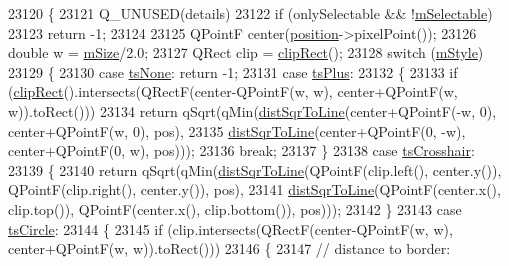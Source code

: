 \begin{DoxyCode}
23120 \{
23121   Q\_UNUSED(details)
23122   if (onlySelectable && !\hyperlink{class_q_c_p_abstract_item_ad81eb35c8726a0f458db9df9732e0e41}{mSelectable})
23123     return -1;
23124 
23125   QPointF center(\hyperlink{class_q_c_p_item_tracer_a69917e2fdb2b3a929c196958feee7cbe}{position}->pixelPoint());
23126   \textcolor{keywordtype}{double} w = \hyperlink{class_q_c_p_item_tracer_a575153a24bb357d1e006f6bc3bd099b9}{mSize}/2.0;
23127   QRect clip = \hyperlink{class_q_c_p_abstract_item_a538e25ff8856534582f5b2b400a46405}{clipRect}();
23128   switch (\hyperlink{class_q_c_p_item_tracer_afb1f236bebf417544e0138fef22a292e}{mStyle})
23129   \{
23130     \textcolor{keywordflow}{case} \hyperlink{class_q_c_p_item_tracer_a2f05ddb13978036f902ca3ab47076500aac27462c79146225bfa8fba24d2ee8a4}{tsNone}: \textcolor{keywordflow}{return} -1;
23131     \textcolor{keywordflow}{case} \hyperlink{class_q_c_p_item_tracer_a2f05ddb13978036f902ca3ab47076500a3323fb04017146e4885e080a459472fa}{tsPlus}:
23132     \{
23133       \textcolor{keywordflow}{if} (\hyperlink{class_q_c_p_abstract_item_a538e25ff8856534582f5b2b400a46405}{clipRect}().intersects(QRectF(center-QPointF(w, w), center+QPointF(w, w)).toRect()))
23134         \textcolor{keywordflow}{return} qSqrt(qMin(\hyperlink{class_q_c_p_abstract_item_acdca343717d625b8abb3c3e38c0ed39d}{distSqrToLine}(center+QPointF(-w, 0), center+QPointF(w, 0), pos),
23135                           \hyperlink{class_q_c_p_abstract_item_acdca343717d625b8abb3c3e38c0ed39d}{distSqrToLine}(center+QPointF(0, -w), center+QPointF(0, w), pos)));
23136       \textcolor{keywordflow}{break};
23137     \}
23138     \textcolor{keywordflow}{case} \hyperlink{class_q_c_p_item_tracer_a2f05ddb13978036f902ca3ab47076500af562ec81ac3ba99e26ef8540cf1ec16f}{tsCrosshair}:
23139     \{
23140       \textcolor{keywordflow}{return} qSqrt(qMin(\hyperlink{class_q_c_p_abstract_item_acdca343717d625b8abb3c3e38c0ed39d}{distSqrToLine}(QPointF(clip.left(), center.y()), QPointF(clip.right(), 
      center.y()), pos),
23141                         \hyperlink{class_q_c_p_abstract_item_acdca343717d625b8abb3c3e38c0ed39d}{distSqrToLine}(QPointF(center.x(), clip.top()), QPointF(center.x(), 
      clip.bottom()), pos)));
23142     \}
23143     \textcolor{keywordflow}{case} \hyperlink{class_q_c_p_item_tracer_a2f05ddb13978036f902ca3ab47076500ae2252c28f4842880d71e9f94e69de94e}{tsCircle}:
23144     \{
23145       \textcolor{keywordflow}{if} (clip.intersects(QRectF(center-QPointF(w, w), center+QPointF(w, w)).toRect()))
23146       \{
23147         \textcolor{comment}{// distance to border:}

\end{DoxyCode}
